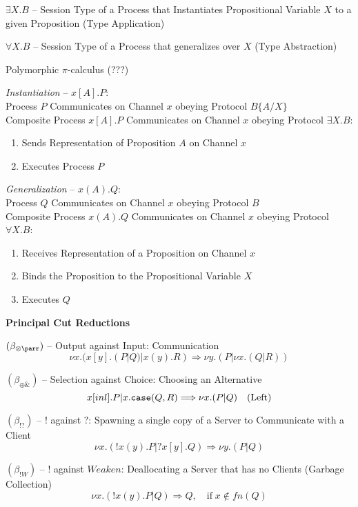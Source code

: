 $\exists X.B$ -- Session Type of a Process that Instantiates
Propositional Variable $X$ to a given Proposition (Type Application)

$\forall X.B$ -- Session Type of a Process that generalizes over $X$
(Type Abstraction)

Polymorphic $\pi$-calculus (???)

\emph{Instantiation} -- $x[A].P$: \\
Process $P$ Communicates on Channel $x$ obeying Protocol $B\{A/X\}$ \\
Composite Process $x[A].P$ Communicates on Channel $x$ obeying
Protocol $\exists X.B$:
\begin{enumerate}
  \item Sends Representation of Proposition $A$ on Channel $x$
  \item Executes Process $P$
\end{enumerate}

\emph{Generalization} -- $x(A).Q$: \\
Process $Q$ Communicates on Channel $x$ obeying Protocol $B$ \\
Composite Process $x(A).Q$ Communicates on Channel $x$ obeying
Protocol $\forall X.B$:
\begin{enumerate}
  \item Receives Representation of a Proposition on Channel $x$
  \item Binds the Proposition to the Propositional Variable $X$
  \item Executes $Q$
\end{enumerate}


\asterism


\textbf{Principal Cut Reductions}

$(\beta_{\otimes \parr})$ -- Output against Input: Communication
\[
  \nu x.(x[y].(P|Q) | x(y).R) \Longrightarrow
    \nu y.(P|\nu x.(Q|R))
\]

$(\beta_{\oplus \&})$ -- Selection against Choice: Choosing an
Alternative
\[
  x[inl].P | x.\mathtt{case}(Q,R) \Longrightarrow \nu x.(P|Q)
    \quad (\text{Left})
\]

$(\beta_{! ?})$ -- $!$ against $?$: Spawning a single copy of
a Server to Communicate with a Client
\[
  \nu x.(!x(y).P | ?x[y].Q) \Longrightarrow \nu y.(P|Q)
\]

$(\beta_{! W})$ -- $!$ against $Weaken$: Deallocating a Server that
has no Clients (Garbage Collection)
\[
  \nu x.(!x(y).P|Q) \Longrightarrow Q,
    \quad \text{if}\; x \notin fn(Q)
\]


